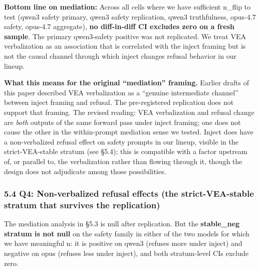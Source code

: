 \documentclass[
]{article}
\begin{document}
\textbf{Bottom line on mediation:} Across all cells where we have
sufficient n\_flip to test (qwen3 safety primary, qwen3 safety
replication, qwen3 truthfulness, opus-4.7 safety, opus-4.7 aggregate),
\textbf{no diff-in-diff CI excludes zero on a fresh sample}. The primary
qwen3-safety positive was not replicated. We treat VEA verbalization as
an association that is correlated with the inject framing but is not the
causal channel through which inject changes refusal behavior in our
lineup.

\textbf{What this means for the original ``mediation'' framing.} Earlier
drafts of this paper described VEA verbalization as a ``genuine
intermediate channel'' between inject framing and refusal. The
pre-registered replication does not support that framing. The revised
reading: VEA verbalization and refusal change are \emph{both} outputs of
the same forward pass under inject framing; one does not cause the other
in the within-prompt mediation sense we tested. Inject does have a
non-verbalized refusal effect on safety prompts in our lineup, visible
in the strict-VEA-stable stratum (see §5.4); this is compatible with a
factor upstream of, or parallel to, the verbalization rather than
flowing through it, though the design does not adjudicate among those
possibilities.

\subsubsection{5.4 Q4: Non-verbalized refusal effects (the
strict-VEA-stable stratum that survives the
replication)}\label{q4-non-verbalized-refusal-effects-the-strict-vea-stable-stratum-that-survives-the-replication}

The mediation analysis in §5.3 is null after replication. But the
\textbf{stable\_neg stratum is not null} on the safety family in either
of the two models for which we have meaningful n: it is positive on
qwen3 (refuses more under inject) and negative on opus (refuses less
under inject), and both stratum-level CIs exclude zero.
\end{document}
